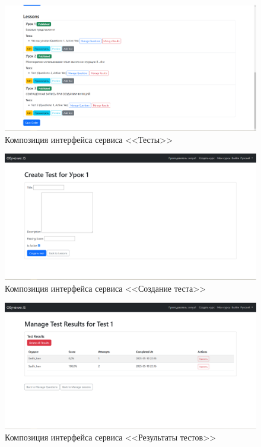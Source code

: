 \begin{figure}[ht]
	\centering
	\includegraphics[width=1\linewidth]{images/Тесты}
	\caption{Композиция интерфейса сервиса <<Тесты>>}
	\label{templ:image4}
\end{figure}

\begin{figure}[ht]
	\centering
	\includegraphics[width=1\linewidth]{images/создатьтест}
	\caption{Композиция интерфейса сервиса <<Создание теста>>}
	\label{templ:image5}
\end{figure}

\begin{figure}[ht]
	\centering
	\includegraphics[width=1\linewidth]{images/результаты}
	\caption{Композиция интерфейса сервиса <<Результаты тестов>>}
	\label{templ:image6}
\end{figure}

